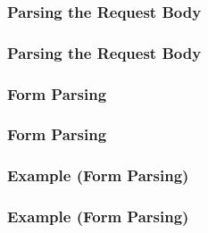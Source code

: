 \begin{frame}
  \frametitle{Parsing the Request Body}
  
\end{frame}

\begin{frame}
  \frametitle{Parsing the Request Body}
  
\end{frame}

\begin{frame}
\end{frame}

\begin{frame}
  \frametitle{Form Parsing}
  
\end{frame}

\begin{frame}
  \frametitle{Form Parsing}
  
\end{frame}

\begin{frame}
\end{frame}

\begin{frame}
  \frametitle{Example (Form Parsing)}
  
\end{frame}

\begin{frame}
  \frametitle{Example (Form Parsing)}
  
\end{frame}

